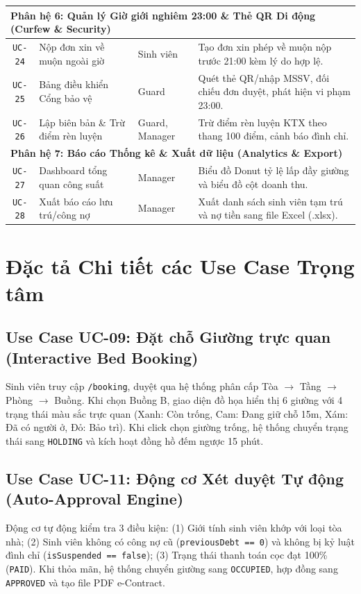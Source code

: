 \documentclass[12pt,a4paper,oneside]{report}
\begin{document}
\begin{table}[htbp]
\begin{tabularx}{\textwidth}{|c|l|l|X|}
\multicolumn{4}{|l|}{\textbf{Phân hệ 6: Quản lý Giờ giới nghiêm 23:00 \& Thẻ QR Di động (Curfew \& Security)}} \\ \hline
\texttt{UC-24} & Nộp đơn xin về muộn ngoài giờ & Sinh viên & Tạo đơn xin phép về muộn nộp trước 21:00 kèm lý do hợp lệ. \\ \hline
\texttt{UC-25} & Bảng điều khiển Cổng bảo vệ & Guard & Quét thẻ QR/nhập MSSV, đối chiếu đơn duyệt, phát hiện vi phạm 23:00. \\ \hline
\texttt{UC-26} & Lập biên bản \& Trừ điểm rèn luyện & Guard, Manager & Trừ điểm rèn luyện KTX theo thang 100 điểm, cảnh báo đình chỉ. \\ \hline
\multicolumn{4}{|l|}{\textbf{Phân hệ 7: Báo cáo Thống kê \& Xuất dữ liệu (Analytics \& Export)}} \\ \hline
\texttt{UC-27} & Dashboard tổng quan công suất & Manager & Biểu đồ Donut tỷ lệ lấp đầy giường và biểu đồ cột doanh thu. \\ \hline
\texttt{UC-28} & Xuất báo cáo lưu trú/công nợ & Manager & Xuất danh sách sinh viên tạm trú và nợ tiền sang file Excel (.xlsx). \\ \hline
\end{tabularx}
\end{table}

\section{Đặc tả Chi tiết các Use Case Trọng tâm}
\subsection{Use Case UC-09: Đặt chỗ Giường trực quan (Interactive Bed Booking)}
Sinh viên truy cập \texttt{/booking}, duyệt qua hệ thống phân cấp Tòa $\rightarrow$ Tầng $\rightarrow$ Phòng $\rightarrow$ Buồng. Khi chọn Buồng B, giao diện đồ họa hiển thị 6 giường với 4 trạng thái màu sắc trực quan (Xanh: Còn trống, Cam: Đang giữ chỗ 15m, Xám: Đã có người ở, Đỏ: Bảo trì). Khi click chọn giường trống, hệ thống chuyển trạng thái sang \texttt{HOLDING} và kích hoạt đồng hồ đếm ngược 15 phút.

\subsection{Use Case UC-11: Động cơ Xét duyệt Tự động (Auto-Approval Engine)}
Động cơ tự động kiểm tra 3 điều kiện: (1) Giới tính sinh viên khớp với loại tòa nhà; (2) Sinh viên không có công nợ cũ (\texttt{previousDebt == 0}) và không bị kỷ luật đình chỉ (\texttt{isSuspended == false}); (3) Trạng thái thanh toán cọc đạt 100\% (\texttt{PAID}). Khi thỏa mãn, hệ thống chuyển giường sang \texttt{OCCUPIED}, hợp đồng sang \texttt{APPROVED} và tạo file PDF e-Contract.
\end{document}
